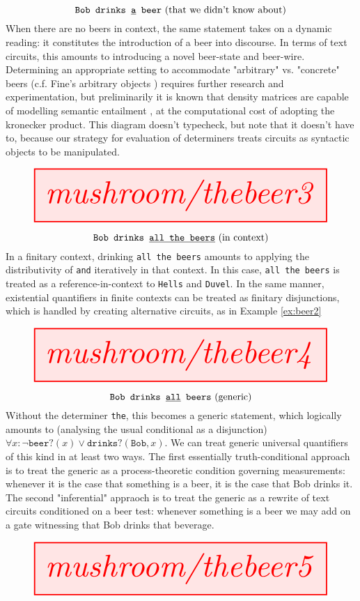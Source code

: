 \begin{myboxR}
\begin{example}\label{ex:det3}
\[\texttt{Bob drinks \underline{a} beer} \text{ (that we didn't know about)}\]
When there are no beers in context, the same statement takes on a dynamic reading: it constitutes the introduction of a beer into discourse. In terms of text circuits, this amounts to introducing a novel beer-state and beer-wire. Determining an appropriate setting to accommodate "arbitrary" vs. "concrete" beers (c.f. Fine's arbitrary objects \citep{urquhart_fine_2020}) requires further research and experimentation, but preliminarily it is known that density matrices are capable of modelling semantic entailment \citep{balkir_distributional_2015}, at the computational cost of adopting the kronecker product. This diagram doesn't typecheck, but note that it doesn't have to, because our strategy for evaluation of determiners treats circuits as syntactic objects to be manipulated.
\end{example}
\[\resizebox{\textwidth}{!}{\tikzfig{mushroom/thebeer3}}\]
\end{myboxR}

\begin{myboxR}
\begin{example}\label{ex:quant2}
\[\texttt{Bob drinks \underline{all the beers}} \text{ (in context)}\]
In a finitary context, drinking \texttt{all the beers} amounts to applying the distributivity of \texttt{and} iteratively in that context. In this case, \texttt{all the beers} is treated as a reference-in-context to \texttt{Hells} and \texttt{Duvel}. In the same manner, existential quantifiers in finite contexts can be treated as finitary disjunctions, which is handled by creating alternative circuits, as in Example \ref{ex:beer2}
\end{example}
\[\resizebox{\textwidth}{!}{\tikzfig{mushroom/thebeer4}}\]
\end{myboxR}

\begin{myboxR}
\begin{example}\label{ex:quant2}
\[\texttt{Bob drinks \underline{all} beers} \text{ (generic)}\]
Without the determiner \texttt{the}, this becomes a generic statement, which logically amounts to (analysing the usual conditional as a disjunction) $\forall x: \neg\texttt{beer?}(x) \vee \texttt{drinks?}(\texttt{Bob},x)$. We can treat generic universal quantifiers of this kind in at least two ways. The first essentially truth-conditional approach is to treat the generic as a process-theoretic condition governing measurements: whenever it is the case that something is a beer, it is the case that Bob drinks it. The second "inferential" appraoch is to treat the generic as a rewrite of text circuits conditioned on a beer test: whenever something is a beer we may add on a gate witnessing that Bob drinks that beverage.
\end{example}
\[\resizebox{\textwidth}{!}{\tikzfig{mushroom/thebeer5}}\]
\end{myboxR}


